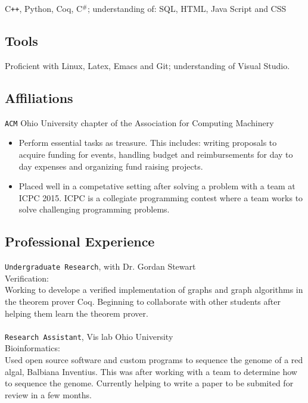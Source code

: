 \documentclass[11pt]{article} %
\begin{document}
C\texttt{++}, Python, Coq, C$^\texttt{\#}$; understanding of: SQL, HTML, Java Script and CSS 
\subsection*{Tools}
Proficient with Linux, Latex, Emacs and Git; understanding of Visual Studio.


\subsection*{Affiliations}
\texttt{ACM} Ohio University chapter of the Association for Computing Machinery
\begin{itemize}
\item Perform essential tasks as treasure. This includes: writing proposals to acquire funding for events, handling budget and reimbursements for day to day expenses and organizing fund raising projects.
\item Placed well in a competative setting after solving a problem with a team at ICPC 2015. ICPC is a collegiate programming contest where a team works to solve challenging programming problems. 
\end{itemize}
\subsection*{Professional Experience} 
\texttt{Undergraduate Research}, with Dr. Gordan Stewart \\
Verification: \\
Working to develope a verified implementation of graphs and graph algorithms in the theorem prover Coq.  Beginning to collaborate with other students after helping them learn the theorem prover.\\ \\
\texttt{Research Assistant}, Vis lab Ohio University \\
Bioinformatics: \\
Used open source software and custom programs to sequence the genome of a red algal, Balbiana Inventius. This was after working with a team to determine how to sequence the genome. Currently helping to write a paper to be submited for review in a few months.
           
\end{document}
